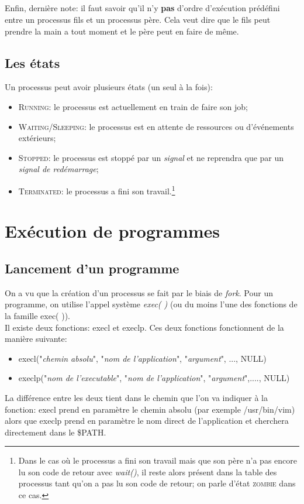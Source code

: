 \documentclass{report}
\begin{document}
\paragraph{}
Enfin, dernière note: il faut savoir qu'il n'y \textbf{pas} d'ordre d'exécution prédéfini entre un processus fils et un processus père. Cela veut dire que le fils peut prendre la main a tout moment et le père peut en faire de même.

\section{Les états}
Un processus peut avoir plusieurs états (un seul à la fois):
\begin{itemize}
\item \textsc{Running}: le processus est actuellement en train de faire son job;
\item \textsc{Waiting/Sleeping}: le processus est en attente de ressources ou d'événements extérieurs;
\item \textsc{Stopped}: le processus est stoppé par un \emph{signal} et ne reprendra que par un \emph{signal de redémarrage};
\item \textsc{Terminated}: le processus a fini son travail.\footnote{Dans le cas où le processus a fini son travail mais que son père n'a pas encore lu son code de retour avec \emph{wait()}, il reste alors présent dans la table des processus tant qu'on a pas lu son code de retour; on parle d'état \textsc{zombie} dans ce cas.}
\end{itemize}




\chapter{Exécution de programmes}
\section{Lancement d'un programme}
On a vu que la création d'un processus se fait par le biais de \emph{fork}. Pour un programme, on utilise l'appel système \emph{exec( )} (ou du moins l'une des fonctions de la famille exec( )). \\
Il existe deux fonctions: execl et execlp. Ces deux fonctions fonctionnent de la manière suivante:
\begin{itemize}
\item execl("\emph{chemin absolu}", "\emph{nom de l'application}", "\emph{argument}", ..., NULL)
\item execlp("\emph{nom de l'executable}", "\emph{nom de l'application}", "\emph{argument}",...., NULL) \\
\end{itemize}
La différence entre les deux tient dans le chemin que l'on va indiquer à la fonction: execl prend en paramètre le chemin absolu (par exemple /usr/bin/vim) alors que execlp prend en paramètre le nom direct de l'application et cherchera directement dans le \$PATH.
\end{document}
